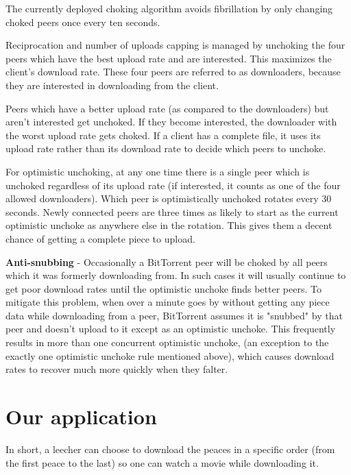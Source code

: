 \documentclass[11pt]{article}
\begin{document}
  \begin{flushleft}

    The currently deployed choking algorithm avoids fibrillation by only changing choked peers once every ten seconds.

  \end{flushleft}
  \begin{flushleft}

    Reciprocation and number of uploads capping is managed by unchoking the four peers which have the best upload rate and are interested. This maximizes the client's download rate. These four peers are referred to as downloaders, because they are interested in downloading from the client.

  \end{flushleft}
  \begin{flushleft}

    Peers which have a better upload rate (as compared to the downloaders) but aren't interested get unchoked. If they become interested, the downloader with the worst upload rate gets choked. If a client has a complete file, it uses its upload rate rather than its download rate to decide which peers to unchoke.

  \end{flushleft}
  \begin{flushleft}

    For optimistic unchoking, at any one time there is a single peer which is unchoked regardless of its upload rate (if interested, it counts as one of the four allowed downloaders). Which peer is optimistically unchoked rotates every 30 seconds. Newly connected peers are three times as likely to start as the current optimistic unchoke as anywhere else in the rotation. This gives them a decent chance of getting a complete piece to upload.

  \end{flushleft}
  \begin{flushleft}

    \textbf{Anti-snubbing} - Occasionally a BitTorrent peer will be choked by all peers which it was formerly downloading from. In such cases it will usually continue to get poor download rates until the optimistic unchoke finds better peers. To mitigate this problem, when over a minute goes by without getting any piece data while downloading from a peer, BitTorrent assumes it is "snubbed" by that peer and doesn't upload to it except as an optimistic unchoke. This frequently results in more than one concurrent optimistic unchoke, (an exception to the exactly one optimistic unchoke rule mentioned above), which causes download rates to recover much more quickly when they falter.

  \end{flushleft}

  \section*{Our application}
  \begin{flushleft}

    In short, a leecher can choose to download the peaces in a specific order (from the first peace to the last) so one can watch a movie while downloading it.

  \end{flushleft}
\end{document}
